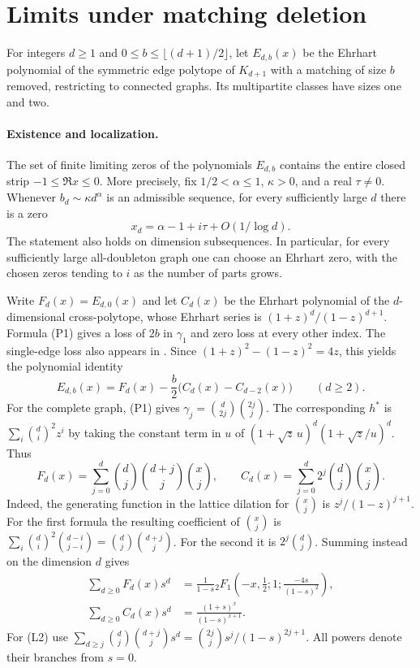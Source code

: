 \documentclass[11pt,a4paper]{article}
\theoremstyle{definition}\newtheorem{problem}[theorem]{Problem}
\begin{document}
\section{Limits under matching deletion}
For integers $d\ge1$ and $0\le b\le\lfloor(d+1)/2\rfloor$, let $E_{d,b}(x)$ be the Ehrhart polynomial of the symmetric edge polytope of $K_{d+1}$ with a matching of size $b$ removed, restricting to connected graphs. Its multipartite classes have sizes one and two. 

\paragraph{Existence and localization.} The set of finite limiting zeros of the polynomials $E_{d,b}$ contains the entire closed strip $-1\le\Re x\le0$. More precisely, fix $1/2<\alpha\le1$, $\kappa>0$, and a real $\tau\ne0$. Whenever $b_d\sim\kappa d^\alpha$ is an admissible sequence, for every sufficiently large $d$ there is a zero
\[
 x_d=\alpha-1+i\tau+O(1/\log d).
\]
The statement also holds on dimension subsequences. In particular, for every sufficiently large all-doubleton graph one can choose an Ehrhart zero, with the chosen zeros tending to $i$ as the number of parts grows.

Write $F_d(x)=E_{d,0}(x)$ and let $C_d(x)$ be the Ehrhart polynomial of the $d$-dimensional cross-polytope, whose Ehrhart series is $(1+z)^d/(1-z)^{d+1}$. Formula (P1) gives a loss of $2b$ in $\gamma_1$ and zero loss at every other index. The single-edge loss also appears in \cite[Example~5.7]{CRV}. Since $(1+z)^2-(1-z)^2=4z$, this yields the polynomial identity
\begin{equation}
 E_{d,b}(x)=F_d(x)-\frac b2\bigl(C_d(x)-C_{d-2}(x)\bigr)\qquad(d\ge2).
 \tag{L1}
\end{equation}
For the complete graph, (P1) gives $\gamma_j=\binom d{2j}\binom{2j}j$. The corresponding $h^*$ is $\sum_i\binom di^2 z^i$ by taking the constant term in $u$ of $(1+\sqrt z\,u)^d(1+\sqrt z/u)^d$. Thus
\[
 F_d(x)=\sum_{j=0}^d\binom dj\binom{d+j}j\binom xj,
 \qquad C_d(x)=\sum_{j=0}^d 2^j\binom dj\binom xj.
\]
Indeed, the generating function in the lattice dilation for $\binom xj$ is $z^j/(1-z)^{j+1}$. For the first formula the resulting coefficient of $\binom xj$ is $\sum_i\binom di^2\binom{d-i}{j-i}=\binom dj\binom{d+j}j$. For the second it is $2^j\binom dj$. Summing instead on the dimension $d$ gives
\begin{align}
 \sum_{d\ge0}F_d(x)s^d&=\frac1{1-s}
 {}_2F_1\left(-x,\tfrac12;1;\frac{-4s}{(1-s)^2}\right),\tag{L2}\\
 \sum_{d\ge0}C_d(x)s^d&=\frac{(1+s)^x}{(1-s)^{x+1}}.\tag{L3}
\end{align}
For (L2) use $\sum_{d\ge j}\binom dj\binom{d+j}j s^d=\binom{2j}j s^j/(1-s)^{2j+1}$. All powers denote their branches from $s=0$.
\end{document}
